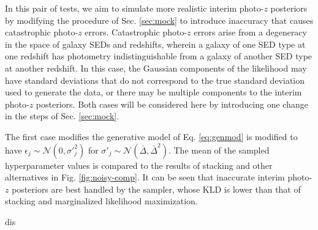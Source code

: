 \documentclass[preprint]{aastex}
\begin{document}
In this pair of tests, we aim to simulate more realistic interim photo-$z$ 
posteriors by modifying the procedure of Sec. \ref{sec:mock} to introduce 
inaccuracy that causes catastrophic photo-$z$ errors.  Catastrophic photo-$z$ 
errors arise from a degeneracy in the space of galaxy SEDs and redshifts, 
wherein a galaxy of one SED type at one redshift has photometry 
indistinguishable from a galaxy of another SED type at another redshift.  In 
this case, the Gaussian components of the likelihood may have standard 
deviations that do not correspond to the true standard deviation used to 
generate the data, or there may be multiple components to the interim photo-$z$ 
posteriors.  Both cases will be considered here by introducing one change in 
the steps of Sec. \ref{sec:mock}.  

The first case modifies the generative model of Eq. \ref{eq:genmod} is modified 
to have $\epsilon_{j}\sim\mathcal{N}(0,\sigma'^{2}_{j})$ for 
$\sigma'_{j}\sim\mathcal{N}(\bar{\Delta},\bar{\Delta}^{2})$.  The mean of the 
sampled hyperparameter values is compared to the results of stacking and other 
alternatives in Fig. \ref{fig:noisy-comp}.  It can be seen that inaccurate 
interim photo-$z$ posteriors are best handled by the sampler, whose KLD is 
lower than that of stacking and marginalized likelihood maximization.

dis
%
\end{document}
